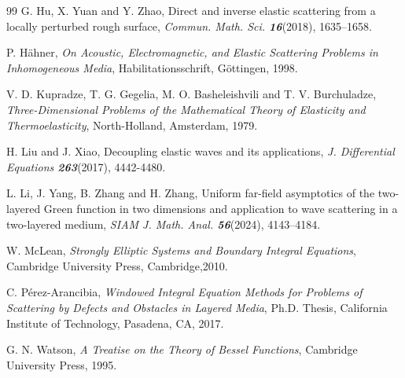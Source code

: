 \documentclass[final,reqno]{siamltex}
\begin{document}
\begin{thebibliography}{99}
 G. Hu, X. Yuan and Y. Zhao, Direct and inverse elastic scattering from a locally perturbed rough surface, {\em Commun. Math. Sci. \bf16}(2018), 1635--1658. 

 P. H\"{a}hner, {\em On Acoustic, Electromagnetic, and Elastic Scattering Problems in Inhomogeneous Media}, Habilitationsschrift, G\"{o}ttingen, 1998. 

 V. D. Kupradze, T. G. Gegelia, M. O. Basheleishvili and T. V. Burchuladze, {\em Three-Dimensional Problems of the Mathematical Theory of Elasticity and Thermoelasticity}, North-Holland, Amsterdam, 1979. 

 H. Liu and J. Xiao, Decoupling elastic waves and its applications, {\em J. Differential Equations \bf263}(2017), 4442-4480. 

 L. Li, J. Yang, B. Zhang and H. Zhang, Uniform far-field asymptotics of the two-layered Green function in two dimensions and application to wave scattering in a two-layered medium, {\em SIAM J. Math. Anal. \bf56}(2024), 4143--4184. 

 W. McLean, {\em Strongly Elliptic Systems and Boundary Integral Equations}, Cambridge University Press, Cambridge,2010. 

 C. P\'{e}rez-Arancibia, {\em Windowed  Integral Equation Methods for Problems of Scattering by Defects and Obstacles in Layered Media}, Ph.D. Thesis, California Institute of Technology, Pasadena, CA, 2017. 

 G. N. Watson, {\em A Treatise on the Theory of Bessel Functions}, Cambridge University Press, 1995. 

\end{thebibliography}
\end{document}
